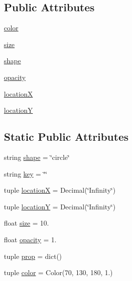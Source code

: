\subsection*{Public Attributes}
\begin{DoxyCompactItemize}
\item 
\hyperlink{class_bridges_1_1element__visualizer_1_1_element_visualizer_adb59ea72f9824578f3c2e8946dd4d588}{color}
\item 
\hyperlink{class_bridges_1_1element__visualizer_1_1_element_visualizer_accfe9e47f83d470165a8bfa8d1ef57c2}{size}
\item 
\hyperlink{class_bridges_1_1element__visualizer_1_1_element_visualizer_adb388088c26e6d232e3eb1e01f4c1bb6}{shape}
\item 
\hyperlink{class_bridges_1_1element__visualizer_1_1_element_visualizer_a8dff1d79beb3adc84e1f7a2d251415f3}{opacity}
\item 
\hyperlink{class_bridges_1_1element__visualizer_1_1_element_visualizer_a51873c21c714a0a309254417ced7feee}{location\+X}
\item 
\hyperlink{class_bridges_1_1element__visualizer_1_1_element_visualizer_a59ea4d6ddad480cc3d014914cf64c35e}{location\+Y}
\end{DoxyCompactItemize}
\subsection*{Static Public Attributes}
\begin{DoxyCompactItemize}
\item 
string \hyperlink{class_bridges_1_1element__visualizer_1_1_element_visualizer_a5bd4e1803cba20426bd7cb60edcee420}{shape} = \char`\"{}circle\char`\"{}
\item 
string \hyperlink{class_bridges_1_1element__visualizer_1_1_element_visualizer_a7fca8f05f8ca3cab859616f0343a7c5d}{key} = \char`\"{}\char`\"{}
\item 
tuple \hyperlink{class_bridges_1_1element__visualizer_1_1_element_visualizer_a2f8503003ece912760a32476c8159ef7}{location\+X} = Decimal(\char`\"{}Infinity\char`\"{})
\item 
tuple \hyperlink{class_bridges_1_1element__visualizer_1_1_element_visualizer_a99973baf0b1b80a88f9f54656c35ce9c}{location\+Y} = Decimal(\char`\"{}Infinity\char`\"{})
\item 
float \hyperlink{class_bridges_1_1element__visualizer_1_1_element_visualizer_a310edf0712e14c6d01264ca050166872}{size} = 10.
\item 
float \hyperlink{class_bridges_1_1element__visualizer_1_1_element_visualizer_a8c32a4ec0b2de8d90dc9ba32a60d3d31}{opacity} = 1.
\item 
tuple \hyperlink{class_bridges_1_1element__visualizer_1_1_element_visualizer_ab9414bbb232332f5a9f3ba3265f4f655}{prop} = dict()
\item 
tuple \hyperlink{class_bridges_1_1element__visualizer_1_1_element_visualizer_a992e2a200777d39b893b88812bc0d873}{color} = Color(70, 130, 180, 1.)
\end{DoxyCompactItemize}


